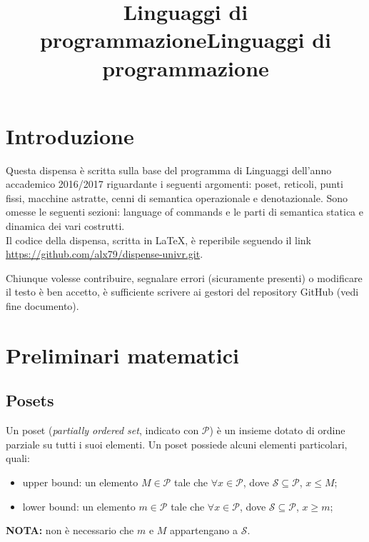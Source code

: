 \documentclass{article}[10pt]
\title{Linguaggi di programmazione}
\begin{document}
	\hypersetup{hidelinks, colorlinks = true, linkcolor = black}
	\large
	
	\title{\Huge \textbf{Linguaggi di programmazione}}
	\pagestyle{fancy}
	
	\maketitle
	\newpage
	
	\tableofcontents
	\newpage
	
	\section{Introduzione}
	Questa dispensa è scritta sulla base del programma di Linguaggi dell'anno accademico 2016/2017 riguardante i seguenti argomenti: poset, reticoli, punti fissi, macchine astratte, cenni di semantica operazionale e denotazionale. Sono omesse le seguenti sezioni: language of commands e le parti di semantica statica e dinamica dei vari costrutti. \\
	
	Il codice della dispensa, scritta in \LaTeX, è reperibile seguendo il link \url{https://github.com/alx79/dispense-univr.git}.
	
	Chiunque volesse contribuire, segnalare errori (sicuramente presenti) o modificare il testo è ben accetto, è sufficiente scrivere ai gestori del repository GitHub (vedi fine documento).
	
	\section{Preliminari matematici}
	\subsection{Posets}
	
	Un poset (\textit{partially ordered set}, indicato con $\mathcal{P}$) è un insieme dotato di ordine parziale su tutti i suoi elementi. Un poset possiede alcuni elementi particolari, quali:
	\begin{itemize}
		\item upper bound: un elemento $M \in \mathcal{P}$ tale che $\forall x \in \mathcal{P}$, dove  $\mathcal{S} \subseteq \mathcal{P}$, $x \leq M$;
		\item lower bound: un elemento $m \in \mathcal{P}$ tale che $\forall x \in \mathcal{P}$, dove  $\mathcal{S} \subseteq \mathcal{P}$, $x \geq m$;
	\end{itemize}
	\textbf{NOTA:} non è necessario che $m$ e $M$ appartengano a $\mathcal{S}$.\\
	
\end{document}
